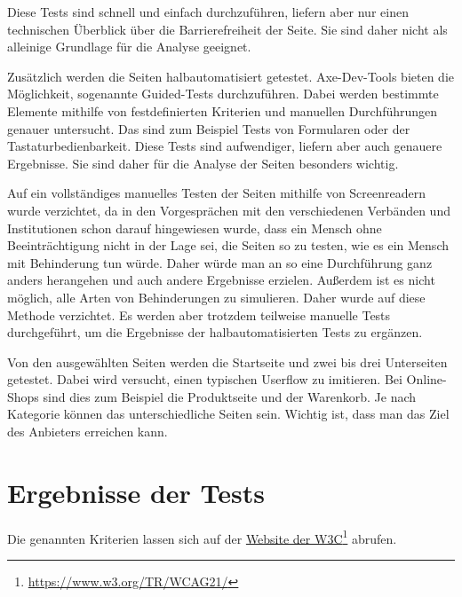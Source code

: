 Diese Tests sind schnell und einfach durchzuführen, liefern aber nur einen technischen Überblick über die Barrierefreiheit der Seite. Sie sind daher nicht als alleinige Grundlage für die Analyse geeignet. 

Zusätzlich werden die Seiten halbautomatisiert getestet. Axe-Dev-Tools bieten die Möglichkeit, sogenannte Guided-Tests durchzuführen. Dabei werden bestimmte Elemente mithilfe von festdefinierten Kriterien und manuellen Durchführungen genauer untersucht. Das sind zum Beispiel Tests von Formularen oder der Tastaturbedienbarkeit. Diese Tests sind aufwendiger, liefern aber auch genauere Ergebnisse. Sie sind daher für die Analyse der Seiten besonders wichtig.

Auf ein vollständiges manuelles Testen der Seiten mithilfe von Screenreadern wurde verzichtet, da in den Vorgesprächen mit den verschiedenen Verbänden und Institutionen schon darauf hingewiesen wurde, dass ein Mensch ohne Beeinträchtigung nicht in der Lage sei, die Seiten so zu testen, wie es ein Mensch mit Behinderung tun würde. Daher würde man an so eine Durchführung ganz anders herangehen und auch andere Ergebnisse erzielen. Außerdem ist es nicht möglich, alle Arten von Behinderungen zu simulieren. Daher wurde auf diese Methode verzichtet. Es werden aber trotzdem teilweise manuelle Tests durchgeführt, um die Ergebnisse der halbautomatisierten Tests zu ergänzen.

Von den ausgewählten Seiten werden die Startseite und zwei bis drei Unterseiten getestet. Dabei wird versucht, einen typischen Userflow zu imitieren. Bei Online-Shops sind dies zum Beispiel die Produktseite und der Warenkorb. Je nach Kategorie können das unterschiedliche Seiten sein. Wichtig ist, dass man das Ziel des Anbieters erreichen kann.

\section{Ergebnisse der Tests}

Die genannten Kriterien lassen sich auf der \href{https://www.w3.org/TR/WCAG21/}{Website der W3C}\footnote{\url{https://www.w3.org/TR/WCAG21/}} abrufen.













